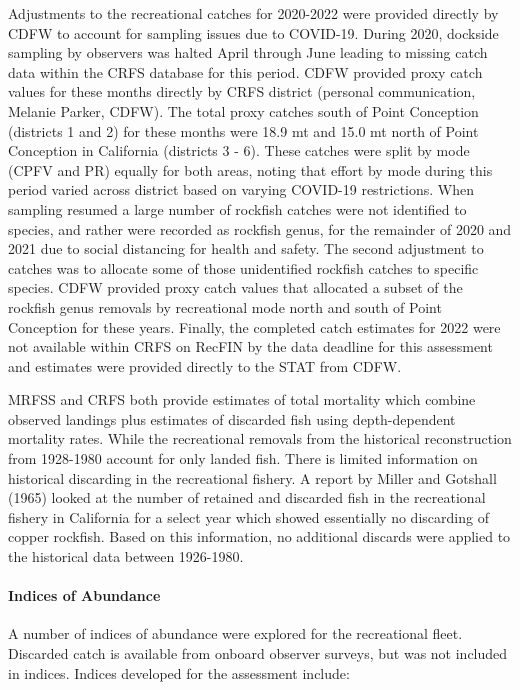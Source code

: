 \documentclass[11pt,
  english,
  letterpaper,
]{article}
\begin{document}
Adjustments to the recreational catches for 2020-2022 were provided directly by CDFW to account for sampling issues due to COVID-19. During 2020, dockside sampling by observers was halted April through June leading to missing catch data within the CRFS database for this period. CDFW provided proxy catch values for these months directly by CRFS district (personal communication, Melanie Parker, CDFW). The total proxy catches south of Point Conception (districts 1 and 2) for these months were 18.9 mt and 15.0 mt north of Point Conception in California (districts 3 - 6). These catches were split by mode (CPFV and PR) equally for both areas, noting that effort by mode during this period varied across district based on varying COVID-19 restrictions. When sampling resumed a large number of rockfish catches were not identified to species, and rather were recorded as rockfish genus, for the remainder of 2020 and 2021 due to social distancing for health and safety. The second adjustment to catches was to allocate some of those unidentified rockfish catches to specific species. CDFW provided proxy catch values that allocated a subset of the rockfish genus removals by recreational mode north and south of Point Conception for these years. Finally, the completed catch estimates for 2022 were not available within CRFS on RecFIN by the data deadline for this assessment and estimates were provided directly to the STAT from CDFW.

MRFSS and CRFS both provide estimates of total mortality which combine observed landings plus estimates of discarded fish using depth-dependent mortality rates. While the recreational removals from the historical reconstruction from 1928-1980 account for only landed fish. There is limited information on historical discarding in the recreational fishery. A report by Miller and Gotshall (1965) looked at the number of retained and discarded fish in the recreational fishery in California for a select year which showed essentially no discarding of copper rockfish. Based on this information, no additional discards were applied to the historical data between 1926-1980.

\hypertarget{indices-of-abundance}{%
\paragraph{Indices of Abundance}\label{indices-of-abundance}}

\hfill\break

A number of indices of abundance were explored for the recreational fleet. Discarded catch is available from onboard observer surveys, but was not included in indices. Indices developed for the assessment include:
\end{document}
